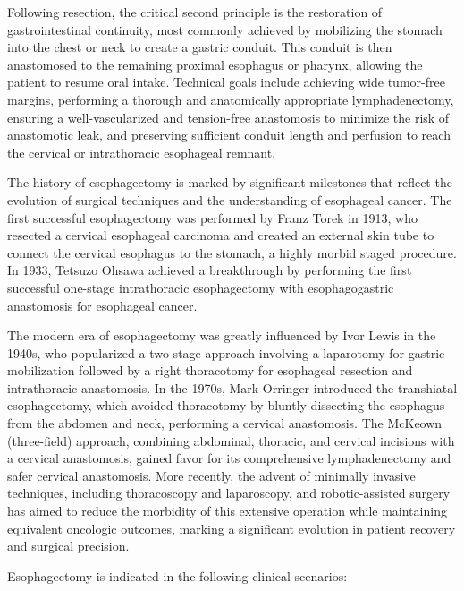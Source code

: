 Following resection, the critical second principle is the restoration of gastrointestinal continuity, most commonly achieved by mobilizing the stomach into the chest or neck to create a gastric conduit. This conduit is then anastomosed to the remaining proximal esophagus or pharynx, allowing the patient to resume oral intake. Technical goals include achieving wide tumor-free margins, performing a thorough and anatomically appropriate lymphadenectomy, ensuring a well-vascularized and tension-free anastomosis to minimize the risk of anastomotic leak, and preserving sufficient conduit length and perfusion to reach the cervical or intrathoracic esophageal remnant.

The history of esophagectomy is marked by significant milestones that reflect the evolution of surgical techniques and the understanding of esophageal cancer. The first successful esophagectomy was performed by Franz Torek in 1913, who resected a cervical esophageal carcinoma and created an external skin tube to connect the cervical esophagus to the stomach, a highly morbid staged procedure. In 1933, Tetsuzo Ohsawa achieved a breakthrough by performing the first successful one-stage intrathoracic esophagectomy with esophagogastric anastomosis for esophageal cancer.

The modern era of esophagectomy was greatly influenced by Ivor Lewis in the 1940s, who popularized a two-stage approach involving a laparotomy for gastric mobilization followed by a right thoracotomy for esophageal resection and intrathoracic anastomosis. In the 1970s, Mark Orringer introduced the transhiatal esophagectomy, which avoided thoracotomy by bluntly dissecting the esophagus from the abdomen and neck, performing a cervical anastomosis. The McKeown (three-field) approach, combining abdominal, thoracic, and cervical incisions with a cervical anastomosis, gained favor for its comprehensive lymphadenectomy and safer cervical anastomosis. More recently, the advent of minimally invasive techniques, including thoracoscopy and laparoscopy, and robotic-assisted surgery has aimed to reduce the morbidity of this extensive operation while maintaining equivalent oncologic outcomes, marking a significant evolution in patient recovery and surgical precision.

Esophagectomy is indicated in the following clinical scenarios:

